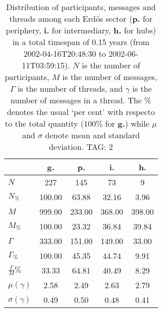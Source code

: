 \begin{table}[h!]
\begin{center}
\begin{tabular}{| l | c | c | c | c |}\hline
 & g. & p. & i. & h. \\\hline
$N$ & 227  & 145  & 73  & 9 \\\hline
$N_{\%}$ & 100.00  & 63.88  & 32.16  & 3.96 \\\hline
$M$ & 999.00  & 233.00  & 368.00  & 398.00 \\\hline
$M_{\%}$ & 100.00  & 23.32  & 36.84  & 39.84 \\\hline
$\Gamma$ & 333.00  & 151.00  & 149.00  & 33.00 \\\hline
$\Gamma_{\%}$ & 100.00  & 45.35  & 44.74  & 9.91 \\\hline
$\frac{\Gamma}{M}\%$ & 33.33  & 64.81  & 40.49  & 8.29 \\\hline
$\mu(\gamma)$ & 2.58  & 2.49  & 2.63  & 2.79 \\\hline
$\sigma(\gamma)$ & 0.49  & 0.50  & 0.48  & 0.41 \\\hline
\end{tabular}
\caption{Distribution of participants, messages and threads among each Erd\"os sector ({\bf p.} for periphery, {\bf i.} for intermediary, 
    {\bf h.} for hubs) in a total timespan of 0.15 years (from 2002-04-16T20:48:30 to 2002-06-11T03:59:15). $N$ is the number of participants, $M$ is the number of messages, $\Gamma$ is the number of threads, and $\gamma$ is the number of messages in a thread.
    The \% denotes the usual `per cent' with respecto to the total quantity ($100\%$ for {\bf g.})
    while $\mu$ and $\sigma$ denote mean and standard deviation. TAG: 2}
\end{center}
\end{table}